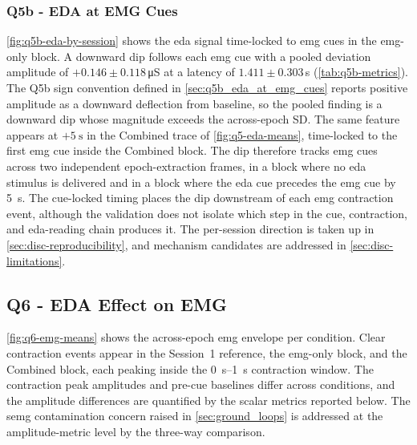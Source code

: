 \subsubsection{Q5b - EDA at EMG Cues}
\label{sec:disc-q5b}

\autoref{fig:q5b-eda-by-session} shows the \gls{eda} signal time-locked to \gls{emg} cues in the \gls{emg}-only block. A downward dip follows each \gls{emg} cue with a pooled deviation amplitude of $+\num{0.146} \pm \num{0.118}$\,\si{\micro\siemens} at a latency of $\num{1.411} \pm \num{0.303}$\,\si{\second} (\autoref{tab:q5b-metrics}). The Q5b sign convention defined in \autoref{sec:q5b_eda_at_emg_cues} reports positive amplitude as a downward deflection from baseline, so the pooled finding is a downward dip whose magnitude exceeds the across-epoch SD. The same feature appears at $+\SI{5}{\second}$ in the Combined trace of \autoref{fig:q5-eda-means}, time-locked to the first \gls{emg} cue inside the Combined block. The dip therefore tracks \gls{emg} cues across two independent epoch-extraction frames, in a block where no \gls{eda} stimulus is delivered and in a block where the \gls{eda} cue precedes the \gls{emg} cue by \SI{5}{\second}. The cue-locked timing places the dip downstream of each \gls{emg} contraction event, although the validation does not isolate which step in the cue, contraction, and \gls{eda}-reading chain produces it. The per-session direction is taken up in \autoref{sec:disc-reproducibility}, and mechanism candidates are addressed in \autoref{sec:disc-limitations}.


\subsection{Q6 - EDA Effect on EMG}
\label{sec:disc-q6}
\autoref{fig:q6-emg-means} shows the across-epoch \gls{emg} envelope per condition. Clear contraction events appear in the Session~1 reference, the \gls{emg}-only block, and the Combined block, each peaking inside the \SIrange{0}{1}{\second} contraction window. The contraction peak amplitudes and pre-cue baselines differ across conditions, and the amplitude differences are quantified by the scalar metrics reported below. The \gls{semg} contamination concern raised in \autoref{sec:ground_loops} is addressed at the amplitude-metric level by the three-way comparison.


